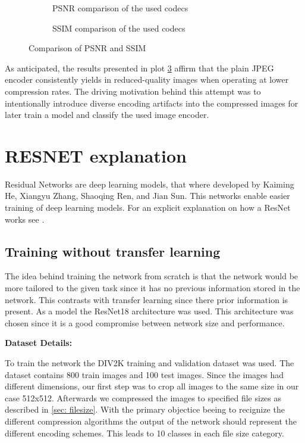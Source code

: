 \begin{figure}[h!]
    \centering
      \begin{subfigure}{0.49\textwidth}
        \resizebox{\textwidth}{!}{}
          \caption{PSNR comparison of the used codecs}
          \label{fig: psnr_comparison}
      \end{subfigure}
      \hfill
      \begin{subfigure}{0.49\textwidth}
        \resizebox{\textwidth}{!}{}
          \caption{SSIM comparison of the used codecs}
          \label{fig:CI}
      \end{subfigure}
\caption{
\label{fig: comparison}%
Comparison of PSNR and SSIM}
\end{figure}

\noindent
As anticipated, the results presented in plot \ref{fig: comparison} affirm that the plain JPEG encoder consistently yields in reduced-quality images when operating at lower compression rates.
The driving motivation behind this attempt was to intentionally introduce diverse encoding artifacts into the compressed images for later train a model and classify the used image encoder.
\newpage

\section{RESNET explanation}
Residual Networks are deep learning models, that where developed by Kaiming He, Xiangyu Zhang, Shaoqing Ren, and Jian Sun. This networks enable easier training of deep learning models. For an explicit explanation on how a ResNet works see \cite{he2015deep}.

\subsection{Training without transfer learning}

The idea behind training the network from scratch is that the network would be more tailored to the given task since it has no previous information stored in the network. This contrasts with transfer learning since there prior information is present. As a model the ResNet18 architecture was used. This architecture was chosen since it is a good compromise between network size and performance.
\newline

\noindent
\textbf{Dataset Details:}

\noindent
To train the network the DIV2K training and validation dataset was used. The dataset contains 800 train images and 100 test images. Since the images had different dimensions, our first step was to crop all images to the same size in our case 512x512. Afterwards we compressed the images to specified file sizes as described in \ref{sec: filesize}. With the primary objectice beeing to recignize the different compression algorithms the output of the network should represent the different encoding schemes. This leads to 10 classes in each file size category.

